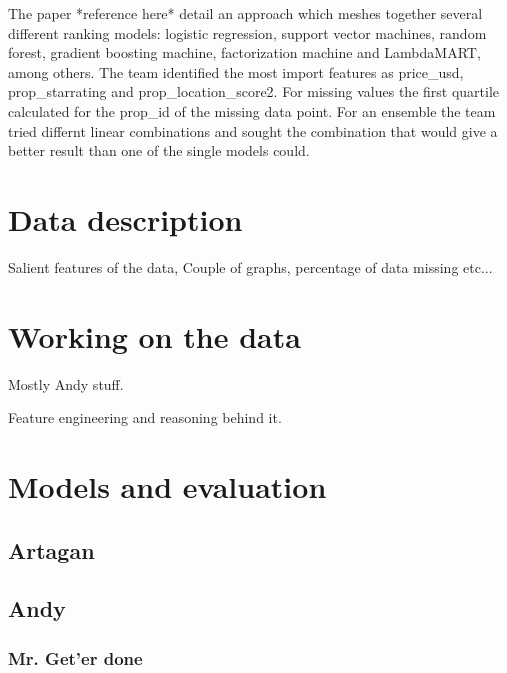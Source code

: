 \documentclass{llncs}
\begin{document}
The paper *reference here* detail an approach which meshes together several different ranking models: logistic regression, support vector machines, random forest, gradient boosting machine, factorization machine and LambdaMART, among others. The team identified the most import features as price\_usd, prop\_starrating and prop\_location\_score2. For missing values the first quartile calculated for the prop\_id of the missing data point. For an ensemble the team tried differnt linear combinations and sought the combination that would give a better result than one of the single models could.  

 
\section{Data description}

Salient features of the data, Couple of graphs, percentage of data missing etc...

\section{Working on the data}

Mostly Andy stuff.

Feature engineering and reasoning behind it.


\section{Models and evaluation}

\subsection*{Artagan}

\subsection*{Andy}

\subsubsection*{Mr. Get'er done}


          


\end{document}
